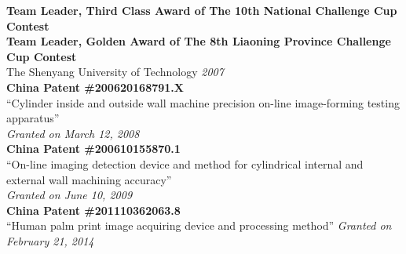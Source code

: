 \documentclass[9pt]{article}
\newenvironment{changemargin}[2]{%
  \begin{list}{}{%
    \setlength{\topsep}{0pt}%
    \setlength{\leftmargin}{#1}%
    \setlength{\rightmargin}{#2}%
    \setlength{\listparindent}{\parindent}%
    \setlength{\itemindent}{\parindent}%
    \setlength{\parsep}{\parskip}%
  }%
  \item[]}{\end{list}
}
\newenvironment{body} {
	\vspace*{-16pt}
	\begin{changemargin}{-0.25in}{-0.5in}
  }	
	{\end{changemargin}
}
\begin{document}
\begin{body}
	\vspace{14pt}	
    \textbf{Team Leader, Third Class Award of The 10th National Challenge Cup Contest\\
    Team Leader, Golden Award of The 8th Liaoning Province Challenge Cup Contest}\\
    The Shenyang University of Technology \hfill{} \emph{2007}\\
    \medskip
    \textbf{China Patent \#200620168791.X}\\
    ``Cylinder inside and outside wall machine precision on-line image-forming testing apparatus''\\
    \hfill{} \emph{Granted on March 12, 2008}\\
    \medskip	
    \textbf{China Patent \#200610155870.1}\\
    ``On-line imaging detection device and method for cylindrical internal and external wall machining accuracy''\\
    \hfill{} \emph{Granted on June 10, 2009}\\
    \medskip    
    \textbf{China Patent \#201110362063.8}\\
    ``Human palm print image acquiring device and processing method'' \hfill{} \emph{Granted on February 21, 2014}
\end{body}
\end{document}
